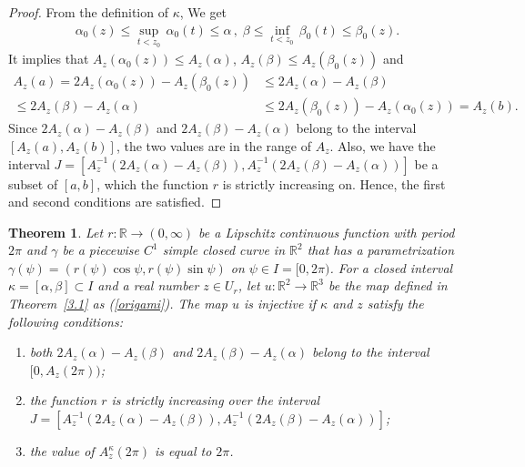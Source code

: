 \documentclass{amsart}
\theoremstyle{plain}
\newtheorem{theorem}{Theorem}[section]
\theoremstyle{definition}
\theoremstyle{remark}
\begin{document}
\begin{proof}
From the definition of $\kappa$, We get
\begin{align*}
\alpha_0(z)\le\sup_{t<z_0}\,\alpha_0(t)\le\alpha\,,\;\beta\le\inf_{t<z_0}\,\beta_0(t)\le\beta_0(z).
\end{align*}
It implies that $A_z(\alpha_0(z))\le A_z(\alpha)$, $A_z(\beta)\le A_z(\beta_0(z))$ and
\begin{align*}
A_z(a)=2A_z(\alpha_0(z))-A_z(\beta_0(z))&\le2A_z(\alpha)-A_z(\beta)\\
\le2A_z(\beta)-A_z(\alpha)&\le2A_z(\beta_0(z))-A_z(\alpha_0(z))=A_z(b).
\end{align*}
Since $2A_z(\alpha)-A_z(\beta)$ and $2A_z(\beta)-A_z(\alpha)$ belong to the interval $[A_z(a),A_z(b)]$, the two values are in the range of $A_z$.
Also, we have the interval $J=[A_z^{-1}(2A_z(\alpha)-A_z(\beta)),A_z^{-1}(2A_z(\beta)-A_z(\alpha))]$ be a subset of $[a,b]$, which the function $r$ is strictly increasing on.
Hence, the first and second conditions are satisfied.
\end{proof}







\begin{theorem}\label{4.4} %
Let $r \colon \mathbb{R}\to(0,\infty)$ be a Lipschitz continuous function with period $2\pi$ and $\gamma$ be a piecewise $C^1$ simple closed curve in $\mathbb{R}^2$ that has a parametrization $\gamma(\psi)=(r(\psi)\cos\psi,r(\psi)\sin\psi)$ on $\psi\in I=[0,2\pi)$. 
For a closed interval $\kappa=[\alpha,\beta]\subset I$ and a real number $z\in U_r$, let $u \colon \mathbb{R}^2\to\mathbb{R}^3$ be the map defined in Theorem~\ref{3.1} as (\ref{origami}).
The map $u$ is injective if $\kappa$ and $z$ satisfy the following conditions:
\begin{enumerate}
\item both $2A_z(\alpha)-A_z(\beta)$ and $2A_z(\beta)-A_z(\alpha)$ belong to the interval $[0,A_z(2\pi))$;
\item the function $r$ is strictly increasing over the interval $J=[A_z^{-1}(2A_z(\alpha)-A_z(\beta)),A_z^{-1}(2A_z(\beta)-A_z(\alpha))]$;
\item the value of $A_z^{\kappa}(2\pi)$ is equal to $2\pi$.
\end{enumerate}
\end{theorem}
\end{document}
